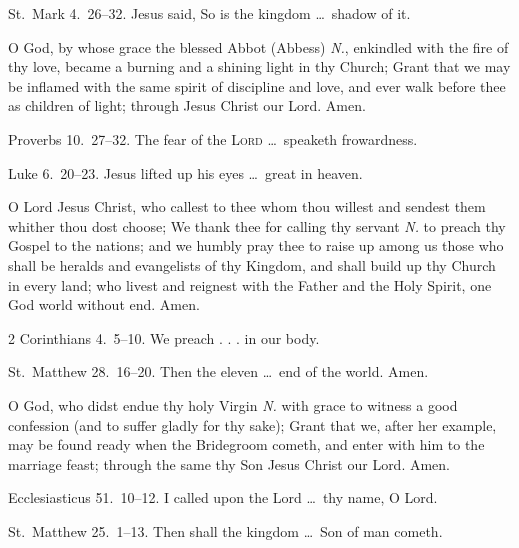  St.~Mark 4.~26–32.   Jesus said, So is the kingdom \ldots\ shadow of it.
 
\medskip


 O God, by whose grace the blessed Abbot (Abbess) \emph{N.}, enkindled with the fire of thy love, became a burning and a shining light in thy Church; Grant that we may be inflamed with the same spirit of discipline and love, and ever walk before thee as children of light; through Jesus Christ our Lord. \R Amen.

 Proverbs 10.~27–32.   The fear of the {\scshape Lord} \ldots\ speaketh frowardness.

 Luke 6.~20–23.   Jesus lifted up his eyes \ldots\ great in heaven.

\medskip


 O Lord Jesus Christ, who callest to thee whom thou willest and sendest them whither thou dost choose; We thank thee for calling thy servant \emph{N.} to preach thy Gospel to the nations; and we humbly pray thee to raise up among us those who shall be heralds and evangelists of thy Kingdom, and shall build up thy Church in every land; who livest and reignest with the Father and the Holy Spirit, one God world without end. \R Amen.

 2 Corinthians 4.~5–10.   We preach . . . in our body.

 St.~Matthew 28.~16–20.   Then the eleven \ldots\ end of the world. Amen.

\medskip


 O God, who didst endue thy holy Virgin \emph{N.} with grace to witness a good confession (and to suffer gladly for thy sake); Grant that we, after her example, may be found ready when the Bridegroom cometh, and enter with him to the marriage feast; through the same thy Son Jesus Christ our Lord. \R Amen.

 Ecclesiasticus 51.~10–12.   I called upon the Lord \ldots\ thy name, O Lord.

 St.~Matthew 25.~1–13.   Then shall the kingdom \ldots\ Son of man cometh.

\medskip


